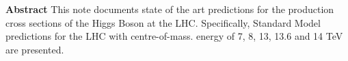 \documentclass[11pt]{report}
\begin{document}
\begin{center}



\textbf{}
	\end{center}

        \thispagestyle{empty}




\mbox{}\vspace*{3em}
%
\begin{center}
    \textbf{Abstract}
 This note documents state of the art predictions for the production cross sections of the Higgs Boson at the LHC. 
 Specifically, Standard Model predictions for the LHC with centre-of-mass. energy of 7, 8, 13, 13.6 and 14 TeV are presented.
\end{center}
%

\newpage

\end{document}
